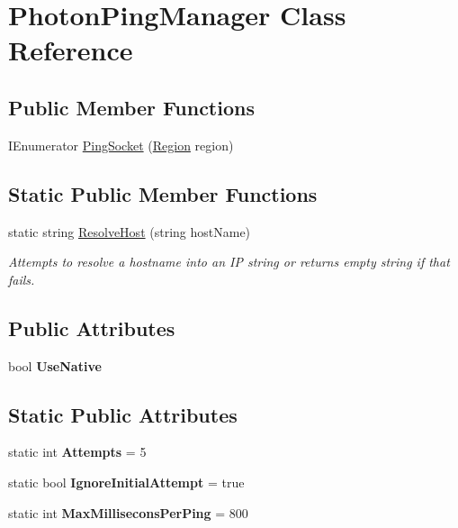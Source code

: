 \hypertarget{class_photon_ping_manager}{}\section{Photon\+Ping\+Manager Class Reference}
\label{class_photon_ping_manager}
\subsection*{Public Member Functions}
\begin{DoxyCompactItemize}
\item 
I\+Enumerator \hyperlink{class_photon_ping_manager_a0ece3c53b5e9db217825d5a3ba74a5f5}{Ping\+Socket} (\hyperlink{class_region}{Region} region)
\end{DoxyCompactItemize}
\subsection*{Static Public Member Functions}
\begin{DoxyCompactItemize}
\item 
static string \hyperlink{class_photon_ping_manager_a489f87655185eb46b0e15de0726c771c}{Resolve\+Host} (string host\+Name)
\begin{DoxyCompactList}\small\item\em Attempts to resolve a hostname into an IP string or returns empty string if that fails. \end{DoxyCompactList}\end{DoxyCompactItemize}
\subsection*{Public Attributes}
\begin{DoxyCompactItemize}
\item 
bool {\bfseries Use\+Native}\hypertarget{class_photon_ping_manager_ab5bc2677649632ad08c581dff24cec4a}{}\label{class_photon_ping_manager_ab5bc2677649632ad08c581dff24cec4a}

\end{DoxyCompactItemize}
\subsection*{Static Public Attributes}
\begin{DoxyCompactItemize}
\item 
static int {\bfseries Attempts} = 5\hypertarget{class_photon_ping_manager_aa37a48018a49beafdb317dbdfbff6d54}{}\label{class_photon_ping_manager_aa37a48018a49beafdb317dbdfbff6d54}

\item 
static bool {\bfseries Ignore\+Initial\+Attempt} = true\hypertarget{class_photon_ping_manager_a0e897316745a60839e2ed3e80cefd2f2}{}\label{class_photon_ping_manager_a0e897316745a60839e2ed3e80cefd2f2}

\item 
static int {\bfseries Max\+Millisecons\+Per\+Ping} = 800\hypertarget{class_photon_ping_manager_ac0c24ceeeff3345bcf1d98bbe37b4014}{}\label{class_photon_ping_manager_ac0c24ceeeff3345bcf1d98bbe37b4014}

\end{DoxyCompactItemize}
